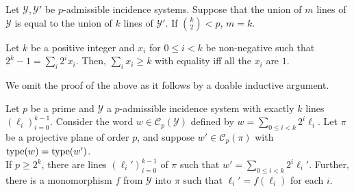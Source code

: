 	\begin{lemma}
		\label{lemma: if union of lines same number of lines}
		Let $\mathcal{Y},\mathcal{Y}'$ be $p$-admissible incidence systems. Suppose that the union of $m$ lines of $\mathcal{Y}$ is equal to the union of $k$ lines of $\mathcal{Y}'$. If $\binom{k}{2} < p$, $m = k$.
	\end{lemma}

	\begin{lemma}
		\label{lem: binary rep border}
		Let $k$ be a positive integer and $x_i$ for $0 \le i < k$ be non-negative such that $2^k - 1 = \sum_i 2^i x_i$. Then, $\sum_i x_i \ge k$ with equality iff all the $x_i$ are $1$.
	\end{lemma}
	We omit the proof of the above as it follows by a doable inductive argument.

	\begin{flem}
		\label{lemma: big lemma for bagchi}
		Let $p$ be a prime and $\mathcal{Y}$ a $p$-admissible incidence system with exactly $k$ lines $(\ell_i)_{i=0}^{k-1}$. Consider the word $w \in \mathcal{C}_p(\mathcal{Y})$ defined by $w = \sum_{0 \le i < k} 2^i \ell_i$. Let $\pi$ be a projective plane of order $p$, and suppose $w' \in \mathcal{C}_p(\pi)$ with $\operatorname{type}(w) = \operatorname{type}(w')$.\\
		If $p \ge 2^k$, there are lines $(\ell_i')_{i=0}^{k-1}$ of $\pi$ such that $w' = \sum_{0 \le i < k} 2^i \ell_i'$. Further, there is a monomorphism $f$ from $\mathcal{Y}$ into $\pi$ such that $\ell_i' = f(\ell_i)$ for each $i$.
	\end{flem}
